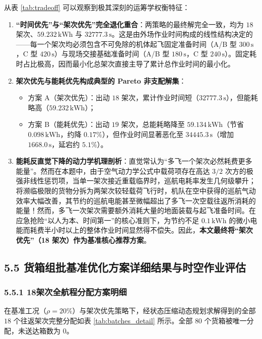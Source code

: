 \documentclass[withoutpreface,bwprint]{format}
\begin{document}
从表 \ref{tab:tradeoff} 可以观察到极其深刻的运筹学权衡特征：
\begin{enumerate}[leftmargin=*]
    \item \textbf{“时间优先”与“架次优先”完全退化重合}：两策略的最终解完全一致，均为 $18$ 架次、$59.232\,\text{kWh}$ 与 $32777.3\,\text{s}$。这是由外场作业时间构成的线性结构决定的——每一个架次均必须包含不可免除的机体起飞固定准备时间（A/B 型 $300\,\text{s}$，C 型 $420\,\text{s}$）与现场交接基础准备时间（A/B 型 $180\,\text{s}$，C 型 $240\,\text{s}$）。固定耗时占比极高，因而最小化总架次直接主导了累计总作业时间的最小化。
    \item \textbf{架次优先与能耗优先构成典型的 Pareto 非支配解集}：
    \begin{itemize}
        \item 方案 A（架次优先）：出动 $18$ 架次，累计作业时间短（$32777.3\,\text{s}$），但能耗略高（$59.232\,\text{kWh}$）；
        \item 方案 B（能耗优先）：出动 $19$ 架次，总能耗略降至 $59.134\,\text{kWh}$（节省 $0.098\,\text{kWh}$，约降 $0.17\%$），但作业时间显著恶化至 $34445.3\,\text{s}$（增加 $1668.0\,\text{s}$，延宕约 $5.1\%$）。
    \end{itemize}
    \item \textbf{能耗反直觉下降的动力学机理剖析}：直觉常认为“多飞一个架次必然耗费更多能量”。然而在本题中，由于空气动力学公式中载荷项存在高达 $3/2$ 次方的极强非线性惩罚项，当单一架次接近重载临界时，巡航电耗率发生几何级攀升；将濒临极限的货物分拆为两架次较轻载荷飞行时，机队在空中获得的巡航气动效率大幅改善，其节约的巡航电能甚至微幅超出了多飞一次空载往返所消耗的能量！然而，多飞一次架次需要额外消耗大量的地面装载与起飞准备时间。在应急抢险“以人为本、时间第一”的核心准则下，为节约不足 $0.1\,\text{kWh}$ 的微小电能而耗费半小时以上的整体作业时间显然得不偿失。因此，\textbf{本文最终将“架次优先”（18 架次）作为基准核心推荐方案}。
\end{enumerate}

\subsection{5.5 货箱组批基准优化方案详细结果与时空作业评估}

\subsubsection{5.5.1 18架次全航程分配方案明细}
在基准工况（$\rho=20\%$）与架次优先策略下，经状态压缩动态规划求解得到的全部 $18$ 个往返架次完整分配如表 \ref{tab:batches_detail} 所示。全部 $80$ 个货箱被唯一分配，未送达箱数为 0。
\end{document}
